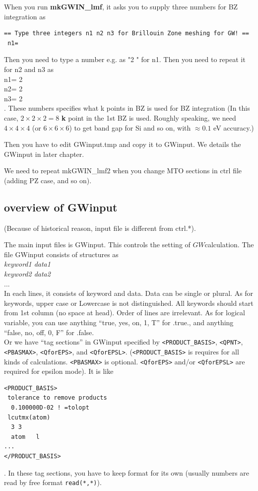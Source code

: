 \documentclass[a4paper,10pt,epsf,fleqn]{article}
\newcommand{\GW}{$GW$}
\newcommand{\io}[1]{{\sf  #1}}
\begin{document}
{\vspace{3mm}
When you run {\bf mkGWIN\_lmf}, 
it asks you to supply three numbers for BZ integration as
{\baselineskip=3mm
\begin{verbatim}
== Type three integers n1 n2 n3 for Brillouin Zone meshing for GW! ==
 n1= 
\end{verbatim}
}
Then you need to type a number e.g. as "2 " for n1.
Then you need to repeat it for n2 and n3 as\\
 n1= 2 \\
 n2= 2 \\
 n3= 2 \\
. 
These numbers specifies what k points in BZ is used for BZ integration 
(In this case, $2\times 2\times 2=8$ {\bf k} point in the 1st BZ is used.
Roughly speaking, we need $4\times 4\times 4$ (or $6\times 6\times 6$) to get
band gap for Si and so on, with $\approx 0.1$ eV accuracy.)

Then you have to edit {\sf GWinput.tmp} and copy it to
{\sf GWinput}. We details the {\sf GWinput} in later chapter.

We need to repeat mkGWIN\_lmf2
when you change MTO sections in ctrl file (adding PZ case, and so on).


\subsection{overview of GWinput}
(Because of historical reason, input file is different from \io{ctrl.*}).

The main input files is {\sf GWinput}.
This controls the setting of \GW calculation.
The file {\sf GWinput} consists of
structures as\\
{\it keyword1 data1}\\
{\it keyword2 data2}\\
...\\
In each lines, it consists of keyword and data. 
Data can be single or plural.
As for keywords, upper case or Lowercase is not distinguished.
All keywords should start from 1st column (no space at head).
Order of lines are irrelevant.
As for logical variable, you can use 
anything ``true, yes, on, 1, T'' for .true.,
and anything ``false, no, off, 0, F'' for .false.\\

Or we have ``tag sections'' in {\sf GWinput} 
specified by \verb#<PRODUCT_BASIS>#, 
\verb#<QPNT>#,  \verb#<PBASMAX>#, \verb#<QforEPS>#, and \verb#<QforEPSL>#.
(\verb#<PRODUCT_BASIS># is requires for all kinds of calculations.
\verb#<PBASMAX># is optional. \verb#<QforEPS># and/or \verb#<QforEPSL># are required
for epsilon mode). It is like
\begin{verbatim}
<PRODUCT_BASIS>
 tolerance to remove products
  0.100000D-02 ! =tolopt
 lcutmx(atom) 
  3 3 
  atom   l
...
</PRODUCT_BASIS>
\end{verbatim}
. In these tag sections, you have to keep format for its own
(usually numbers are read by free format \verb#read(*,*)#).

}
\end{document}
